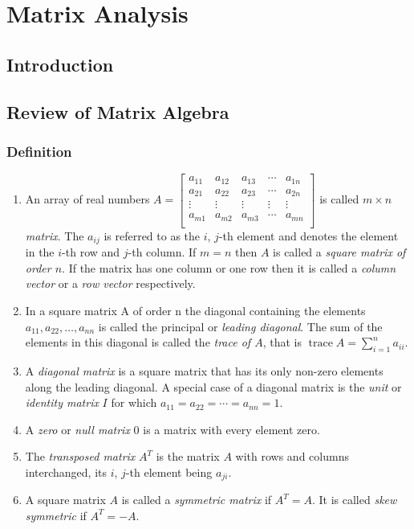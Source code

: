 \documentclass[12pt,a4paper,fleqn]{mycalc}
\begin{document}
	\chapter{Matrix Analysis}
	\section{Introduction}
	\section{Review of Matrix Algebra}
	\subsection{Definition}
	\begin{enumerate}[a]
		\item An array of real numbers 
		$
		A=\begin{bmatrix}
		a_{11} & a_{12} & a_{13} & \cdots & a_{1n}\\
		a_{21} & a_{22} & a_{23} & \cdots & a_{2n}\\
		\vdots & \vdots & \vdots & \vdots & \vdots\\
		a_{m1} & a_{m2} & a_{m3} & \cdots & a_{mn}\\
		\end{bmatrix}
		$
		is called \emph{$ m\times n $ matrix}. The $ a_{ij} $ is referred to as the $ i $, $ j $-th element and denotes the element in the $ i $-th row and $ j $-th column. If $ m = n $ then $ A $ is called a \emph{square matrix of order $ n $}. If the matrix has one column or one row then it is called a \emph{column vector} or a \emph{row vector} respectively.
		\item In a square matrix A of order n the diagonal containing the elements $ a_{11}, a_{22}, \dots ,
		a_{nn} $ is called the principal or \emph{leading diagonal}. The sum of the elements in this diagonal is called the \emph{trace of $ A $}, that is $ \operatorname{trace} A=\sum_{i=1}^{n}a_{ii}. $
		\item A \emph{diagonal matrix} is a square matrix that has its only non-zero elements along the leading diagonal. A special case of a diagonal matrix is the \emph{unit} or \emph{identity matrix} $ I $ for which $ a_{11} = a_{22} = \cdots = a_{nn} = 1. $
		\item A \emph{zero} or \emph{null matrix} $ 0 $ is a matrix with every element zero.
		\item The \emph{transposed matrix} $ A^{T} $ is the matrix $ A $ with rows and columns interchanged,
		its $ i $, $ j $-th element being $ a_{ji}. $
		\item A square matrix $ A $ is called a \emph{symmetric matrix} if $ A^{T}=A. $ It is called \emph{skew symmetric} if $ A^{T}=-A. $
	\end{enumerate}
\end{document}
